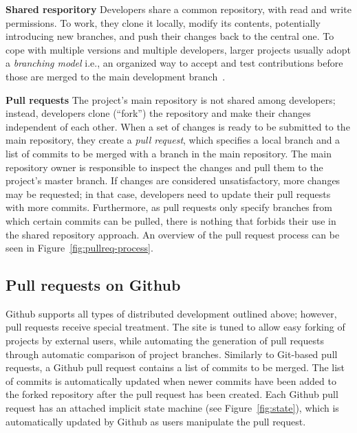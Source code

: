 \documentclass{sig-alternate}
\begin{document}
\textbf{Shared resporitory}
    Developers share a common repository, with read and
    write permissions. To work, they clone it locally, modify its contents,
    potentially introducing new branches, and push their changes back to the
    central one. To cope with multiple versions and multiple developers, larger
    projects usually adopt a {\em branching model} i.e., an organized way to
    accept and test contributions before those are merged to the main
    development branch~\cite{Bird12}. 
    

\textbf{Pull requests} The project's main repository is not shared among
developers; instead, developers clone (``fork'') the repository and make their
changes independent of each other. When a set of changes is ready to be
submitted to the main repository, they create a \emph{pull request}, which
specifies a local branch and a list of commits to be merged with a branch in the
main repository. The main repository owner is responsible to inspect the
changes and pull them to the project's master branch. If changes are considered
unsatisfactory, more changes may be requested; in that case, developers need to
update their pull requests with more commits. Furthermore, as
pull requests only specify branches from which certain commits can be pulled,
there is nothing that forbids their use in the shared repository approach. An
overview of the pull request process can be seen in Figure~\ref{fig:pullreq-process}.

\subsection{Pull requests on Github}

Github supports all types of distributed development outlined above; however,
pull requests receive special treatment. The site is tuned to allow easy forking
of projects by external users, while automating the generation of pull
requests through automatic comparison of project branches. Similarly to
Git-based pull requests, a Github pull request contains a list of commits
to be merged. The list of commits is automatically updated when newer commits have been added to the forked repository after the pull request
has been created. Each Github pull request has an attached implicit state
machine (see Figure~\ref{fig:state}), which is automatically updated by
Github as users manipulate the pull request.
\end{document}
